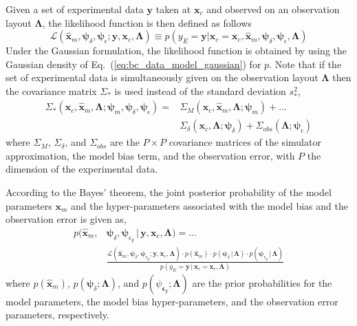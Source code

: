 Given a set of experimental data $\mathbf{y}$ taken at $\mathbf{x}_c$ and observed on an observation layout $\bm{\Lambda}$,
the likelihood function is then defined as follows
\begin{equation}
  \mathcal{L}(\hat{\bm{x}}_m, \bm{\psi}_\delta, \bm{\psi}_\epsilon; \mathbf{y}, \mathbf{x}_c, \bm{\Lambda}) \equiv p(y_E = \mathbf{y} | \bm{x}_c = \mathbf{x}_c, \hat{\bm{x}}_m, \bm{\psi}_\delta, \bm{\psi}_{\epsilon}, \bm{\Lambda})
\label{eq:bc_likelihood}
\end{equation}
Under the Gaussian formulation, the likelihood function is obtained by using the Gaussian density of Eq.~(\ref{eq:bc_data_model_gaussian}) for $p$.
Note that if the set of experimental data is simultaneously given on the observation layout $\bm{\Lambda}$ then the covariance matrix $\Sigma_*$ is used instead of the standard deviation $s^2_*$,
\begin{equation}
	\begin{split}
	\Sigma_*(\bm{x}_c, \hat{\bm{x}}_m, \bm{\Lambda}; \bm{\psi}_m, \bm{\psi}_\delta, \bm{\psi}_\epsilon) = & \Sigma_M(\bm{x}_c, \hat{\bm{x}}_m, \bm{\Lambda}; \bm{\psi}_{m}) + \ldots \\ 
	& \Sigma_\delta(\bm{x}_c, \bm{\Lambda}; \bm{\psi}_\delta) + \Sigma_{obs}(\bm{\Lambda}; \bm{\psi}_\epsilon)
	\end{split}
\label{eq:bc_gaussian_covariance_matrix}
\end{equation}
where $\Sigma_M$, $\Sigma_\delta$, and $\Sigma_{obs}$ are the $P \times P$ covariance matrices of the simulator approximation, the model bias term, and the observation error, with $P$ the dimension of the experimental data.

According to the Bayes' theorem, the joint posterior probability of the model parameters $\bm{x}_m$ and
the hyper-parameters associated with the model bias and the observation error is given as, 
\begin{equation}
	\begin{split}
  p(\hat{\bm{x}}_m, & \bm{\psi}_\delta, \bm{\psi}_{\epsilon_y}\,|\,\mathbf{y}, \mathbf{x}_c, \bm{\Lambda}) = \ldots \\
	& \frac{\mathcal{L}(\hat{\bm{x}}_m, \bm{\psi}_\delta, \bm{\psi}_{\epsilon_y} ; \mathbf{y}, \mathbf{x}_c, \bm{\Lambda}) \cdot p(\hat{\bm{x}}_m) \cdot p(\bm{\psi}_{\delta}\,|\,\bm{\Lambda}) \cdot p(\bm{\psi}_{\epsilon_y}\,|\,\bm{\Lambda})}{p(y_E = \mathbf{y}\,|\,\bm{x}_c = \mathbf{x}_c , \bm{\Lambda})}
	\end{split}
\label{eq:bc_joint_posterior}
\end{equation}
where $p(\hat{\bm{x}}_m)$, $p(\bm{\psi}_{\delta}; \bm{\Lambda})$, and $p(\psi_{\bm{\epsilon}_y}; \bm{\Lambda})$ are the prior probabilities for the model parameters, the model bias hyper-parameters, and the observation error parameters, respectively.

